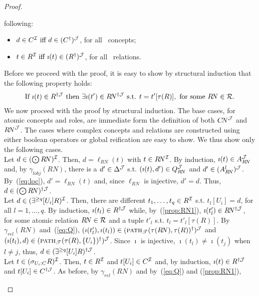 \documentclass[envcountsame,draft]{llncs}
\newcommand{\lreif}[1]{\ensuremath{\bigodot#1}}
\newcommand{\Int}[1]{#1^{\Imc}\xspace}
\newcommand{\pth}[2]{\ensuremath{\textsc{path}_{\mathscr{T}}(#1,#2)}\xspace}
\begin{document}
\begin{proof}
\begin{enumerate}
  following:
  \begin{itemize}
  \item $d\in \Int{C} \text{ iff } d\in (C^\dag)^\Jmc$, for all \DLRpm\ concepts;
  \item $t\in \Int{R} \text{ iff } \imath(t)\in (R^\dag)^\Jmc$, for all \DLRpm\ relations.
  \end{itemize}
%
  Before we proceed with the proof, it is easy to show by structural
  induction that the following property holds:
  \begin{align}\label{prop:RN1}
    \text{If } \imath(t)\in R^{\dag\mathcal{J}} \text{ then } \exists
    \imath(t')\in R\!N^{\dag\mathcal{J}} 
    \text{ s.t. } t=t'[\tau(R)], \text{ for some } R\!N\in\mathcal R.
  \end{align}
%
  We now proceed with the proof by structural induction. The base
  cases, for atomic concepts and roles, are immediate form the
  definition of both ${C\!N}^\mathcal{J}$ and ${R\!N}^\mathcal{J}$.
%
  The cases where complex concepts and relations are constructed using
  either boolean operators or global reification are easy to show. We
  thus show only the following cases.\\
%
  Let $d\in(\lreif R\!N)^\Imc$. Then, $d=\ell_{R\!N}(t)$ with
  $t\in R\!N^\mathcal{I}$. By induction, $\imath(t)\in A_{R\!N}^\mathcal{J}$ and, by
  $\gamma_{\textit{lobj}}({R\!N})$, there is a $d'\in\Delta^\mathcal{J}$
  s.t. $(\imath(t),d')\in Q_{R\!N}^\mathcal{J}$ and
  $d'\in (A_{R\!N}^l)^\mathcal{J}$. By~(\ref{eq:loc}), $d'=\ell_{R\!N}(t)$
  and, since $\ell_{R\!N}$ is injective, $d'=d$. Thus,  $d\in(\lreif
  R\!N)^{\dag\Jmc}$.\\
%
  Let $d\in(\exists^{\geq q}[U_i] R)^\mathcal{I}$. Then, there are different
  $t_1,\ldots,t_q\in R^\mathcal{I}$ s.t. $t_l[U_i]=d$, for all
  $l=1,\ldots,q$. By induction, $\imath(t_l)\in R^{\dag \mathcal{J}}$ while,
  by~(\ref{prop:RN1}), $\imath(t'_l)\in R\!N^{\dag\mathcal{J}}$, for
  some atomic relation ${R\!N}\in\mathcal R$ and a tuple $t'_l$
  s.t. $t_l=t'_l[\tau(R)]$. By~$\gamma_{\textit{rel}}({R\!N})$
  and~(\ref{eq:Q}), $(\imath(t'_l),\imath(t_l))\in
  (\pth{\tau({R\!N})}{\tau(R)}^\dag)^\Jmc$ and  $(\imath(t_l),d)\in
  (\pth{\tau({R})}{\{U_i\}}^\dag)^\Jmc$. Since $\imath$ is injective,
  $\imath(t_l)\neq \imath(t_j)$ when $l\neq j$,
  thus, $d\in(\exists^{\geq q}[U_i] R)^{\dag\mathcal{J}}$.\\
%
  Let $t\in(\sigma_{U_i : C} R)^\mathcal{I}$. Then, $t\in R^\mathcal{I}$ and
  $t[U_i]\in C^\mathcal{I}$ and, by induction, $\imath(t)\in R^{\dag \mathcal{J}}$
  and $t[U_i]\in C^{\dag \mathcal{J}}$. As before, by
  $\gamma_{\textit{rel}}(R\!N)$ and by~(\ref{eq:Q}) and (\ref{prop:RN1}),

\end{enumerate}
\end{proof}
\end{document}
